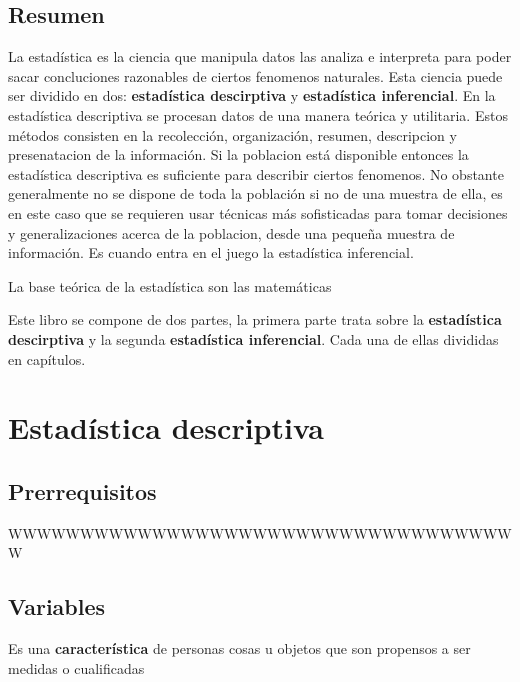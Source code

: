 \documentclass[10pt,]{krantz}
\theoremstyle{definition}
\theoremstyle{definition}
\theoremstyle{definition}
\theoremstyle{definition}
\theoremstyle{remark}
\begin{document}
\hypertarget{resumen}{%
\chapter*{Resumen}\label{resumen}}


La estadística es la ciencia que manipula datos las analiza e interpreta para poder sacar concluciones razonables de ciertos fenomenos naturales. Esta ciencia puede ser dividido en dos: \textbf{estadística descirptiva} y \textbf{estadística inferencial}. En la estadística descriptiva se procesan datos de una manera teórica y utilitaria. Estos métodos consisten en la recolección, organización, resumen, descripcion y presenatacion de la información. Si la poblacion está disponible entonces la estadística descriptiva es suficiente para describir ciertos fenomenos. No obstante generalmente no se dispone de toda la población si no de una muestra de ella, es en este caso que se requieren usar técnicas más sofisticadas para tomar decisiones y generalizaciones acerca de la poblacion, desde una pequeña muestra de información. Es cuando entra en el juego la estadística inferencial.

La base teórica de la estadística son las matemáticas

Este libro se compone de dos partes, la primera parte trata sobre la \textbf{estadística descirptiva} y la segunda \textbf{estadística inferencial}. Cada una de ellas divididas en capítulos.

\mainmatter

\hypertarget{part-estaduxedstica-descriptiva}{%
\part{Estadística descriptiva}\label{part-estaduxedstica-descriptiva}}

\hypertarget{prerrequisitos}{%
\chapter{Prerrequisitos}\label{prerrequisitos}}

WWWWWWWWWWWWWWWWWWWWWWWWWWWWWWWWWWWW

\hypertarget{variables}{%
\chapter{Variables}\label{variables}}

Es una \textbf{característica} de personas cosas u objetos que son propensos a ser medidas o cualificadas
\end{document}
